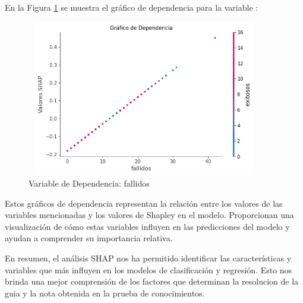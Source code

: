 En la Figura \ref{fig:dependencia_fallidos_lr} se muestra el gráfico de dependencia para la variable :

\begin{figure}[H]
    \centering
    \includegraphics[width=4.0611in,height=2.6861in]{img/shap_lr/fallidos.png}
    \caption{Variable de Dependencia: fallidos}
    \label{fig:dependencia_fallidos_lr}
\end{figure}

Estos gráficos de dependencia representan la relación entre los valores de las variables mencionadas y los valores de Shapley en el modelo. Proporcionan una visualización de cómo estas variables influyen en las predicciones del modelo y ayudan a comprender su importancia relativa.

En resumen, el análisis SHAP nos ha permitido identificar las características y variables que más influyen en los modelos de clasificación y regresión. Esto nos brinda una mejor comprensión de los factores que determinan la resolucion de la guia y la nota obtenida en la prueba de conocimientos.



